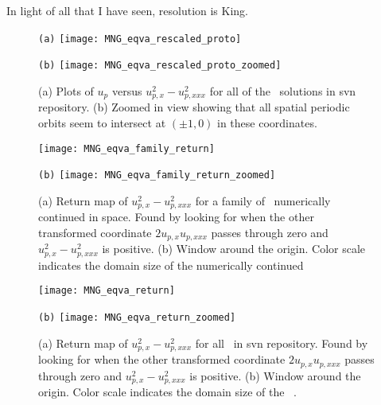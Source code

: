 \begin{description}
{In light of all that I have seen, resolution is King.
    }


\begin{figure}
\begin{minipage}[height=.32\textheight]{.5\textwidth}
\centering \small{\texttt{(a)}}
\texttt{[image: MNG\_eqva\_rescaled\_proto]}
\end{minipage}
\begin{minipage}[height=.32\textheight]{.5\textwidth}
\centering \small{\texttt{(b)}}
\texttt{[image: MNG\_eqva\_rescaled\_proto\_zoomed]}
\end{minipage}
\caption{ \label{fig:MNG_eqva_proto}
(a) Plots of $u_p$ versus $u_{p,x}^2-u_{p,xxx}^2$ for all of the \eqva\ solutions in svn repository.
(b) Zoomed in view showing that all spatial periodic orbits seem to intersect at
$(\pm 1, 0)$ in these coordinates.
}
\end{figure}

\begin{figure}
\begin{minipage}[height=.32\textheight]{.5\textwidth}
\centering
\texttt{[image: MNG\_eqva\_family\_return]}
\end{minipage}
\begin{minipage}[height=.32\textheight]{.5\textwidth}
\centering \small{\texttt{(b)}}
\texttt{[image: MNG\_eqva\_family\_return\_zoomed]}
\end{minipage}
\caption{ \label{fig:MNG_eqva_family_returnmap}
(a) Return map of  $u_{p,x}^2-u_{p,xxx}^2$ for a family of \eqva\ numerically continued in space. Found by looking for when the other transformed coordinate $2u_{p,x}u_{p,xxx}$ passes through zero and $u_{p,x}^2-u_{p,xxx}^2$ is positive. (b) Window around the origin. Color scale indicates the domain size of the numerically continued \eqva\
}
\end{figure}

\begin{figure}
\begin{minipage}[height=.32\textheight]{.5\textwidth}
\centering
\texttt{[image: MNG\_eqva\_return]}
\end{minipage}
\begin{minipage}[height=.32\textheight]{.5\textwidth}
\centering \small{\texttt{(b)}}
\texttt{[image: MNG\_eqva\_return\_zoomed]}
\end{minipage}
\caption{ \label{fig:MNG_eqva_returnmap}
(a) Return map of  $u_{p,x}^2-u_{p,xxx}^2$ for all \eqva\ in svn repository. Found by looking for when the other transformed coordinate $2u_{p,x}u_{p,xxx}$ passes through zero and $u_{p,x}^2-u_{p,xxx}^2$ is positive. (b) Window around the origin. Color scale indicates the domain size of the \eqva\ .
}
\end{figure}


\end{description}

